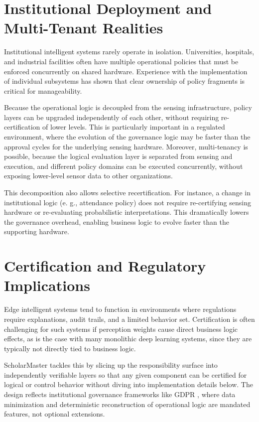 \documentclass[conference]{IEEEtran}
\begin{document}
\section{Institutional Deployment and Multi-Tenant Realities}
Institutional intelligent systems rarely operate in isolation. Universities, hospitals, and industrial facilities often have multiple operational policies that must be enforced concurrently on shared hardware. Experience with the implementation of individual subsystems has shown that clear ownership of policy fragments is critical for manageability. 

Because the operational logic is decoupled from the sensing infrastructure, policy layers can be upgraded independently of each other, without requiring re-certification of lower levels. This is particularly important in a regulated environment, where the evolution of the governance logic may be faster than the approval cycles for the underlying sensing hardware. Moreover, multi-tenancy is possible, because the logical evaluation layer is separated from sensing and execution, and different policy domains can be executed concurrently, without exposing lower-level sensor data to other organizations.

This decomposition also allows selective recertification. For instance, a change in institutional logic (e. g., attendance policy) does not require re-certifying sensing hardware or re-evaluating probabilistic interpretations. This dramatically lowers the governance overhead, enabling business logic to evolve faster than the supporting hardware.

\section{Certification and Regulatory Implications}
Edge intelligent systems tend to function in environments where regulations require explanations, audit trails, and a limited behavior set. Certification is often challenging for such systems if perception weights cause direct business logic effects, as is the case with many monolithic deep learning systems, since they are typically not directly tied to business logic.

ScholarMaster tackles this by slicing up the responsibility surface into independently verifiable layers so that any given component can be certified for logical or control behavior without diving into implementation details below. The design reflects institutional governance frameworks like GDPR \cite{b11}, where data minimization and deterministic reconstruction of operational logic are mandated features, not optional extensions.
\end{document}
